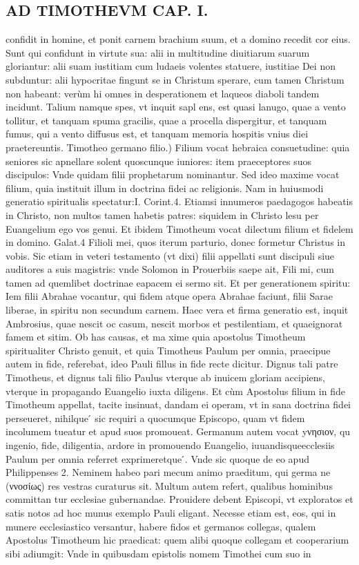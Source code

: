 \documentclass{article}
\begin{document}
\begin{pages}
\section*{AD TIMOTHEVM CAP. I. }
\marginpar{[ p.5 ]}\pstart confidit in homine, et ponit carnem brachium suum, et a domino recedit cor eius. Sunt qui confidunt in virtute sua: alii in multitudine diuitiarum suarum gloriantur: alii suam iustitiam cum ludaeis volentes statuere, iustitiae Dei non subduntur: alii hypocritae fingunt se in Christum sperare, cum tamen Christum non habeant: verùm hi omnes in desperationem et laqueos diaboli tandem incidunt. Talium namque  spes, vt inquit sapl ens, est quasi lanugo, quae a vento tollitur, et tanquam spuma gracilis, quae a procella dispergitur, et tanquam fumus, qui a vento diffusus est, et tanquam memoria hospitis vnius diei praetereuntis.  \pend\pstart Timotheo germano filio.) Filium vocat hebraica consuetudine: quia seniores sic apnellare solent quoscunque  iuniores: item praeceptores suos discipulos: Vnde quidam filii prophetarum nominantur. Sed ideo maxime vocat filium, quia instituit illum in doctrina fidei ac religionis. Nam in huiusmodi generatio spiritualis spectatur:I. Corint.4. Etiamsi innumeros paedagogos habeatis in Christo, non multos tamen habetis patres: siquidem in Christo lesu per Euangelium ego vos genui. Et ibidem Timotheum vocat dilectum filium et fidelem in domino. Galat.4 Filioli mei, quos iterum parturio, donec formetur Christus in vobis. Sic etiam in veteri testamento (vt dixi) filii appellati sunt discipuli siue auditores a suis magistris: vnde Solomon in Prouerbiis saepe ait, Fili mi, cum tamen ad quemlibet doctrinae eapacem ei sermo sit. Et per generationem spiritu: Iem filii Abrahae vocantur, qui fidem atque  opera Abrahae faciunt, filii Sarae liberae, in spiritu non secundum carnem. Haec vera et firma generatio est, inquit Ambrosius, quae nescit oc casum, nescit morbos et pestilentiam, et quaeignorat famem et sitim. Ob has causas, et ma xime quia apostolus Timotheum spiritualiter Christo genuit, et quia Timotheus Paulum per omnia, praecipue autem in fide, referebat, ideo Pauli fillus in fide recte dicitur. Dignus tali patre Timotheus, et dignus tali filio Paulus vterque  ab inuicem gloriam accipiens, vterque  in propagando Euangelio iuxta diligens. Et cùm Apostolus filium in fide Timotheum appellat, tacite insinuat, dandam ei operam, vt in sana doctrina fidei perseueret, nihilque ́ sic requiri a quocumque  Episcopo, quam vt fidem incolumem tueatur et apud suos promoueat.  \pend\pstart Germanum autem vocat yνησιον, qu ingenio, fide, diligentia, ardore in promouendo Euangelio, iuuandisqueecclesiis Paulum per omnia referret exprimeretque ́. Vnde sic quoque  de eo apud Philippenses 2. Neminem habeo pari mecum animo praeditum, qui germa ne (ννοσίως) res vestras curaturus sit. Multum autem refert, qualibus hominibus committan tur ecclesiae gubernandae. Prouidere debent Episcopi, vt exploratos et satis notos ad hoc munus exemplo Pauli eligant. Necesse etiam est, eos, qui in munere ecclesiastico versantur, habere fidos et germanos collegas, qualem Apostolus Timotheum hic praedicat: quem alibi quoque  collegam et cooperarium sibi adiumgit: Vnde in quibusdam epistolis nomem Timothei cum suo in 
\end{pages}
\end{document}

